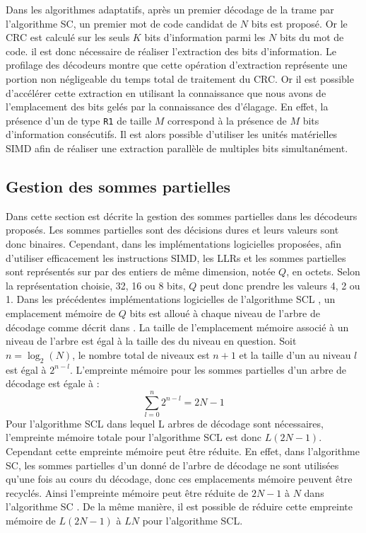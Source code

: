 Dans les algorithmes adaptatifs, après un premier décodage de la trame par l'algorithme SC, un premier mot de code candidat de $N$ bits est proposé. Or le CRC est calculé sur les seuls $K$ bits d'information parmi les $N$ bits du mot de code. il est donc nécessaire de réaliser l'extraction des bits d'information. Le profilage des décodeurs montre que cette opération d'extraction représente une portion non négligeable du temps total de traitement du CRC. Or il est possible d'accélérer cette extraction en utilisant la connaissance que nous avons de l'emplacement des bits gelés par la connaissance des \noeuds d'élagage. En effet, la présence d'un \noeud de type \texttt{R1} de taille $M$ correspond à la présence de $M$ bits d'information consécutifs. Il est alors possible d'utiliser les unités matérielles SIMD afin de réaliser une extraction parallèle de multiples bits simultanément.


\subsection{Gestion des sommes partielles}
Dans cette section est décrite la gestion des sommes partielles dans les décodeurs proposés.
Les sommes partielles sont des décisions dures et leurs valeurs sont donc binaires. Cependant, dans les implémentations logicielles proposées, afin d'utiliser efficacement les instructions SIMD, les LLRs et les sommes partielles sont représentés sur par des entiers de même dimension, notée $Q$, en octets. Selon la représentation choisie, 32, 16 ou 8 bits, $Q$ peut donc prendre les valeurs 4, 2 ou 1. 
Dans les précédentes implémentations logicielles de l'algorithme SCL \cite{sarkis_fast_2016,sarkis_increasing_2014,shen_low-latency_2016}, un emplacement mémoire de $Q$ bits est alloué à chaque niveau de l'arbre de décodage comme décrit dans \cite{tal_list_2011}. La taille de l'emplacement mémoire associé à un niveau de l'arbre est égal à la taille des \noeuds du niveau en question. Soit $n=\log_2(N)$, le nombre total de niveaux est $n+1$ et la taille d'un \noeud au niveau $l$ est égal à $2^{n-l}$. L'empreinte mémoire pour les sommes partielles d'un arbre de décodage est égale à : 
\begin{equation}
\sum^n_{l=0}2^{n-l}=2N-1
\end{equation}
Pour l'algorithme SCL dans lequel L arbres de décodage sont nécessaires, l'empreinte mémoire totale pour l'algorithme SCL est donc $L(2N-1)$. Cependant cette empreinte mémoire peut être réduite. En effet, dans l'algorithme SC, les sommes partielles d'un \noeud donné de l'arbre de décodage ne sont utilisées qu'une fois au cours du décodage, donc ces emplacements mémoire peuvent être recyclés. Ainsi l'empreinte mémoire peut être réduite de $2N-1$ à $N$ dans l'algorithme SC \cite{leroux_hardware_2011}. De la même manière, il est possible de réduire cette empreinte mémoire de $L(2N-1)$ à $LN$ pour l'algorithme SCL.

